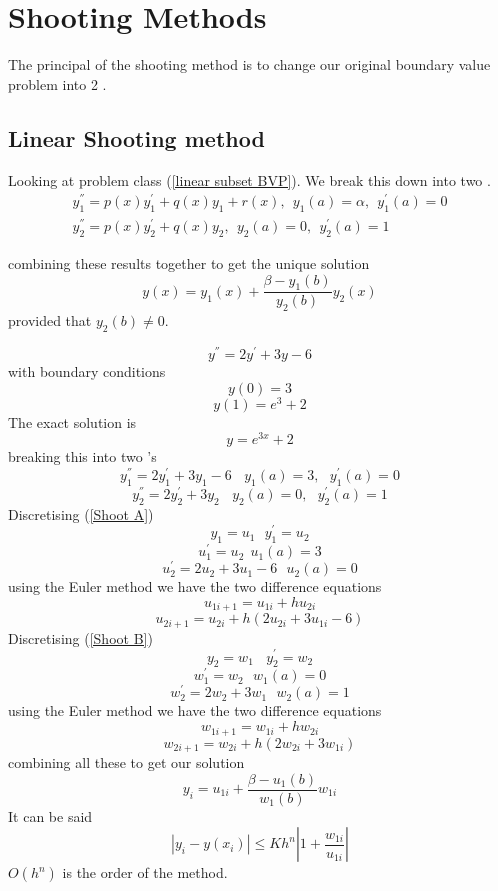 \section{Shooting Methods}
The principal of the shooting method is to change our original boundary value problem  into 2 .
\subsection{Linear Shooting method}
Looking at problem class (\ref{linear subset BVP}).  We break this down into two
.
\begin{equation}
\begin{split}
 y^{''}_1=p(x)y^{'}_1+q(x)y_1+r(x), \ \    y_1(a)=\alpha, \ \ y^{'}_1(a)=0\\
y^{''}_2=p(x)y^{'}_2+q(x)y_2, \ \ y_2(a)=0, \ \ y^{'}_2(a)=1
\end{split}
\end{equation}


combining these results together to get the unique solution 
\begin{equation}
y(x)=y_1(x)+\frac{\beta-y_1(b)}{y_2(b)}y_2(x)
\end{equation}
provided that $y_2(b)\not=0$.
\begin{example}
\[ y^{''}=2y^{'}+3y-6 \]
with boundary conditions
\[y(0) = 3 \]
\[y(1) = e^3+2 \]
The exact solution is 
\[y=e^{3x}+2 \]
breaking this  into two 's
\begin{equation}
\label{Shoot A}
y^{''}_1 =2y^{'}_1+3y_{1}-6 \ \ \ \ y_1(a)=3, \ \ \ y^{'}_1(a)=0\end{equation}
\begin{equation}
\label{Shoot B}
y^{''}_2 =2y^{'}_2+3y_{2} \ \ \ \ y_2(a)=0, \ \ \ y^{'}_2(a)=1\end{equation}
Discretising (\ref{Shoot A})
\[ y_1=u_1 \ \ \ y_1^{'}=u_2\]
\[u_1^{'}=u_2 \ \  u_1(a)=3\]
\[u_2^{'}=2u_2+3u_1-6 \ \ \ u_2(a)=0\]
using the Euler method we have the two difference equations
\[u_{1 i+1}=u_{1 i} + h u_{2 i}\]
\[u_{2 i+1}=u_{2 i} + h (2u_{2 i}+3u_{1 i} -6)\]
Discretising (\ref{Shoot B})
\[ y_2=w_1 \ \ \ \  y_2^{'}=w_2\]
\[w_1^{'}=w_2 \ \ \  w_1(a)=0\]
\[w_2^{'}=2w_2+3w_1 \ \ \ w_2(a)=1\]
using the Euler method we have the two difference equations
\[w_{1 i+1}=w_{1 i} + h w_{2 i}\]
\[w_{2 i+1}=w_{2 i} + h (2w_{2 i}+3w_{1 i})\]
combining all these to get our solution
\[y_i=u_{1 i} + \frac{\beta-u_{1}(b)}{w_1(b)}w_{1 i}\]
It can be said 
\[ |y_i - y(x_i)| \leq K h^n\left|1+\frac{w_{1 i}}{u_{1 i}}\right| \]
$O(h^n)$ is the order of the method.
\end{example}



